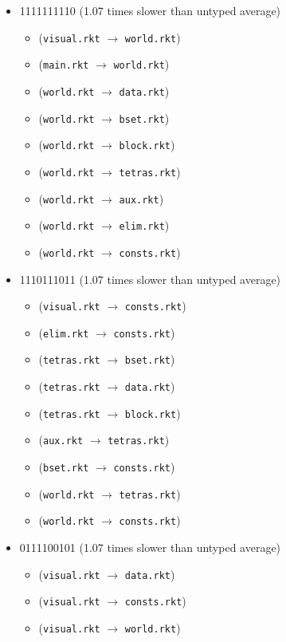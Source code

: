 \documentclass{article}
\newcommand{\mono}[1]{\texttt{#1}}
\begin{document}
\begin{itemize}
\item 1111111110 (1.07 times slower than untyped average)
  \begin{itemize}
  \item (\mono{visual.rkt} $\rightarrow$ \mono{world.rkt})
  \item (\mono{main.rkt} $\rightarrow$ \mono{world.rkt})
  \item (\mono{world.rkt} $\rightarrow$ \mono{data.rkt})
  \item (\mono{world.rkt} $\rightarrow$ \mono{bset.rkt})
  \item (\mono{world.rkt} $\rightarrow$ \mono{block.rkt})
  \item (\mono{world.rkt} $\rightarrow$ \mono{tetras.rkt})
  \item (\mono{world.rkt} $\rightarrow$ \mono{aux.rkt})
  \item (\mono{world.rkt} $\rightarrow$ \mono{elim.rkt})
  \item (\mono{world.rkt} $\rightarrow$ \mono{consts.rkt})
  \end{itemize}
\item 1110111011 (1.07 times slower than untyped average)
  \begin{itemize}
  \item (\mono{visual.rkt} $\rightarrow$ \mono{consts.rkt})
  \item (\mono{elim.rkt} $\rightarrow$ \mono{consts.rkt})
  \item (\mono{tetras.rkt} $\rightarrow$ \mono{bset.rkt})
  \item (\mono{tetras.rkt} $\rightarrow$ \mono{data.rkt})
  \item (\mono{tetras.rkt} $\rightarrow$ \mono{block.rkt})
  \item (\mono{aux.rkt} $\rightarrow$ \mono{tetras.rkt})
  \item (\mono{bset.rkt} $\rightarrow$ \mono{consts.rkt})
  \item (\mono{world.rkt} $\rightarrow$ \mono{tetras.rkt})
  \item (\mono{world.rkt} $\rightarrow$ \mono{consts.rkt})
  \end{itemize}
\item 0111100101 (1.07 times slower than untyped average)
  \begin{itemize}
  \item (\mono{visual.rkt} $\rightarrow$ \mono{data.rkt})
  \item (\mono{visual.rkt} $\rightarrow$ \mono{consts.rkt})
  \item (\mono{visual.rkt} $\rightarrow$ \mono{world.rkt})

\end{itemize}
\end{itemize}
\end{document}
